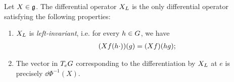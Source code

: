 \begin{proposition}
    Let $X \in \mathfrak{g}$.
    The differential operator ${X}_L$ is the only differential operator satisfying the following properties:
    \begin{enumerate}
        \item ${X}_L$ is \emph{left-invariant},
            i.e. for every $h \in G$, we have
            \begin{align*}
                (X f(h \cdot))(g) = (X f)(h g);
            \end{align*}
        \item The vector in $T_e G$ corresponding to the differentiation by ${X}_L$ at $e$ is precisely $\dd \Phi^{-1}(X)$.
    \end{enumerate}
\end{proposition}

